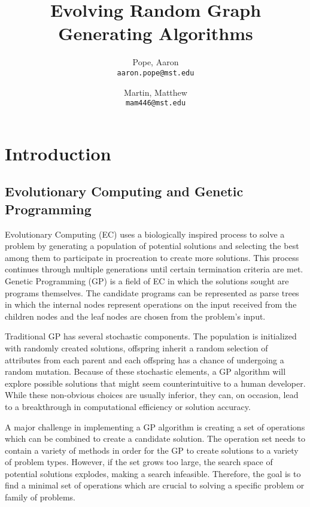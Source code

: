 \documentclass{article}
\begin{document}
\title{Evolving Random Graph Generating Algorithms}

\author{
Pope, Aaron\\
\texttt{aaron.pope@mst.edu}
\and
Martin, Matthew\\
\texttt{mam446@mst.edu}
}

\maketitle

\section{Introduction}

\subsection{Evolutionary Computing and Genetic Programming}

Evolutionary Computing (EC) uses a biologically inspired process to solve a problem by generating a population of potential solutions and selecting the best among them to participate in procreation to create more solutions. This process continues through multiple generations until certain termination criteria are met. Genetic Programming (GP) is a field of EC in which the solutions sought are programs themselves. The candidate programs can be represented as parse trees in which the internal nodes represent operations on the input received from the children nodes and the leaf nodes are chosen from the problem's input.

Traditional GP has several stochastic components. The population is initialized with randomly created solutions, offspring inherit a random selection of attributes from each parent and each offspring has a chance of undergoing a random mutation. Because of these stochastic elements, a GP algorithm will explore possible solutions that might seem counterintuitive to a human developer. While these non-obvious choices are usually inferior, they can, on occasion, lead to a breakthrough in computational efficiency or solution accuracy.

A major challenge in implementing a GP algorithm is creating a set of operations which can be combined to create a candidate solution. The operation set needs to contain a variety of methods in order for the GP to create solutions to a variety of problem types. However, if the set grows too large, the search space of potential solutions explodes, making a search infeasible. Therefore, the goal is to find a minimal set of operations which are crucial to solving a specific problem or family of problems.
\end{document}
